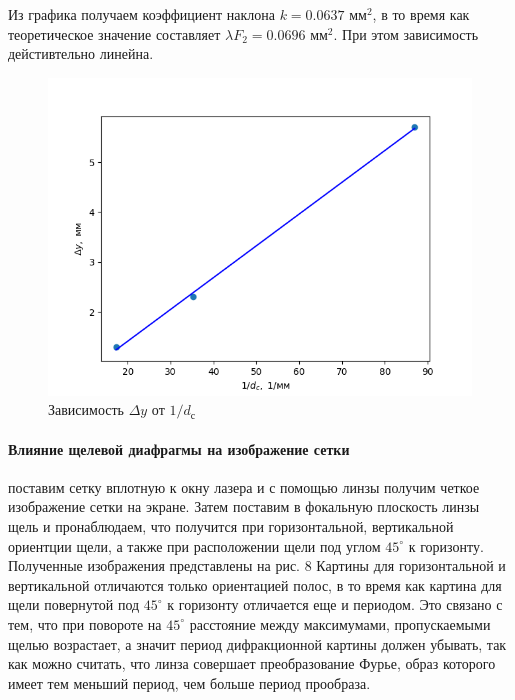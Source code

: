 \documentclass[a4paper,12pt]{article}
\begin{document}
\noindent
Из графика получаем коэффициент наклона $k = 0.0637$ мм$^2$, в то время как теоретическое значение составляет $\lambda F_2 = 0.0696$ мм$^2$. При этом зависимость дейстивтельно линейна.

\begin{figure}[H]
    \centering
    \includegraphics[scale=0.5]{III.png}
    \caption{Зависимость $\Delta y$ от $1/d_\text{с}$}
\end{figure}

\paragraph{Влияние щелевой диафрагмы на изображение сетки} поставим сетку вплотную к окну лазера и с помощью линзы получим четкое изображение сетки на экране. Затем поставим в фокальную плоскость линзы щель и пронаблюдаем, что получится при горизонтальной, вертикальной ориентции щели, а также при расположении щели под углом $45^\circ$ к горизонту. Полученные изображения представлены на рис. 8 Картины для горизонтальной и вертикальной отличаются только ориентацией полос, в то время как картина для щели повернутой под $45^\circ$ к горизонту отличается еще и периодом. Это связано с тем, что при повороте на $45^\circ$ расстояние между максимумами, пропускаемыми щелью возрастает, а значит период дифракционной картины должен убывать, так как можно считать, что линза совершает преобразование Фурье, образ которого имеет тем меньший период, чем больше период прообраза.
\end{document}
